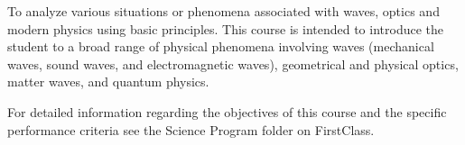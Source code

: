 {To analyze various situations or phenomena associated with waves, optics and modern physics using basic principles. This course is intended to introduce the student to a broad range of physical phenomena involving waves (mechanical waves, sound waves, and electromagnetic waves), geometrical and physical optics, matter waves, and quantum physics. 
\smallskip

For detailed information regarding the objectives of this course and the specific performance criteria see the Science Program folder on FirstClass.}
